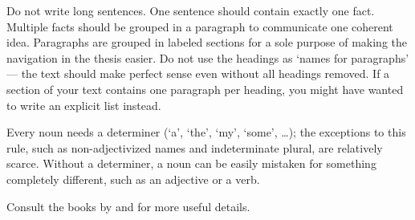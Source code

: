 Do not write long sentences. One sentence should contain exactly one fact. Multiple facts should be grouped in a paragraph to communicate one coherent idea. Paragraphs are grouped in labeled sections for a sole purpose of making the navigation in the thesis easier. Do not use the headings as `names for paragraphs' --- the text should make perfect sense even without all headings removed. If a section of your text contains one paragraph per heading, you might have wanted to write an explicit list instead.

Every noun needs a determiner (`a', `the', `my', `some', \dots); the exceptions to this rule, such as non-adjectivized names and indeterminate plural, are relatively scarce. Without a determiner, a noun can be easily mistaken for something completely different, such as an adjective or a verb.

Consult the books by \citet{glasman2010science} and \citet{sparling1989english} for more useful details.
